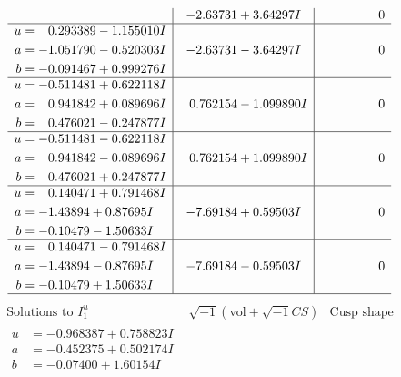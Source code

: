 \documentclass[1p]{elsarticle_modified}
\theoremstyle{definition}
\newcommand{\I}{\sqrt{-1}}
\begin{document}
$$\begin{array}{c|c|c}
 & -2.63731 + 3.64297 I & \phantom{-0.000000 } 0 \\ \hline\begin{aligned}
u &= \phantom{-}0.293389 - 1.155010 I \\
a &= -1.051790 - 0.520303 I \\
b &= -0.091467 + 0.999276 I\end{aligned}
 & -2.63731 - 3.64297 I & \phantom{-0.000000 } 0 \\ \hline\begin{aligned}
u &= -0.511481 + 0.622118 I \\
a &= \phantom{-}0.941842 + 0.089696 I \\
b &= \phantom{-}0.476021 - 0.247877 I\end{aligned}
 & \phantom{-}0.762154 - 1.099890 I & \phantom{-0.000000 } 0 \\ \hline\begin{aligned}
u &= -0.511481 - 0.622118 I \\
a &= \phantom{-}0.941842 - 0.089696 I \\
b &= \phantom{-}0.476021 + 0.247877 I\end{aligned}
 & \phantom{-}0.762154 + 1.099890 I & \phantom{-0.000000 } 0 \\ \hline\begin{aligned}
u &= \phantom{-}0.140471 + 0.791468 I \\
a &= -1.43894 + 0.87695 I \\
b &= -0.10479 - 1.50633 I\end{aligned}
 & -7.69184 + 0.59503 I & \phantom{-0.000000 } 0 \\ \hline\begin{aligned}
u &= \phantom{-}0.140471 - 0.791468 I \\
a &= -1.43894 - 0.87695 I \\
b &= -0.10479 + 1.50633 I\end{aligned}
 & -7.69184 - 0.59503 I & \phantom{-0.000000 } 0\\
 \hline 
 \end{array}$$\newpage$$\begin{array}{c|c|c}  
\text{Solutions to }I^u_{1}& \I (\text{vol} + \sqrt{-1}CS) & \text{Cusp shape}\\
 \hline 
\begin{aligned}
u &= -0.968387 + 0.758823 I \\
a &= -0.452375 + 0.502174 I \\
b &= -0.07400 + 1.60154 I\end{aligned}

\end{array}$$
\end{document}
